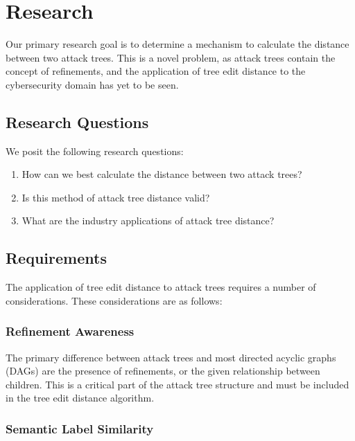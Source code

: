 
\section{Research}

Our primary research goal is to determine a mechanism to calculate the distance between two attack trees. This is a novel problem, as attack trees contain the concept of refinements, and the application of tree edit distance to the cybersecurity domain has yet to be seen.

\subsection{Research Questions}

We posit the following research questions:

\begin{enumerate}
    \item[\RQ{1}] How can we best calculate the distance between two attack trees?
    \item[\RQ{2}] Is this method of attack tree distance valid?
    \item[\RQ{3}] What are the industry applications of attack tree distance?
\end{enumerate}


\subsection{Requirements}
\label{ssec:requirements}

The application of tree edit distance to attack trees requires a number of considerations. These considerations are as follows:


\subsubsection{Refinement Awareness}
\label{sssec:refinement}

The primary difference between attack trees and most directed acyclic graphs (DAGs) are the presence of refinements, or the given relationship between children. This is a critical part of the attack tree structure and must be included in the tree edit distance algorithm.

\subsubsection{Semantic Label Similarity}
\label{sssec:label-similarity}

